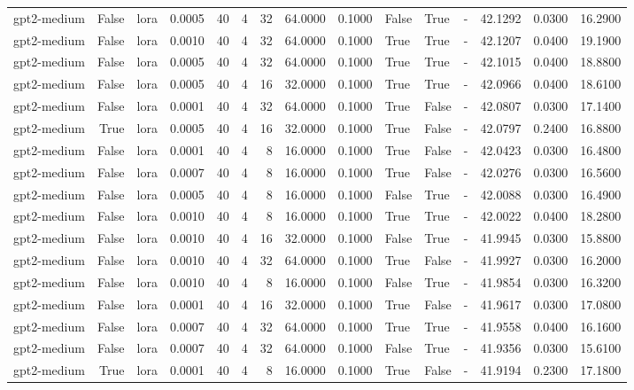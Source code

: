 \begin{tabular}{lrlrrrrrrlllrrr}
gpt2-medium & False & lora & 0.0005 & 40 & 4 & 32 & 64.0000 & 0.1000 & False & True & - & 42.1292 & 0.0300 & 16.2900 \\
gpt2-medium & False & lora & 0.0010 & 40 & 4 & 32 & 64.0000 & 0.1000 & True & True & - & 42.1207 & 0.0400 & 19.1900 \\
gpt2-medium & False & lora & 0.0005 & 40 & 4 & 32 & 64.0000 & 0.1000 & True & True & - & 42.1015 & 0.0400 & 18.8800 \\
gpt2-medium & False & lora & 0.0005 & 40 & 4 & 16 & 32.0000 & 0.1000 & True & True & - & 42.0966 & 0.0400 & 18.6100 \\
gpt2-medium & False & lora & 0.0001 & 40 & 4 & 32 & 64.0000 & 0.1000 & True & False & - & 42.0807 & 0.0300 & 17.1400 \\
gpt2-medium & True & lora & 0.0005 & 40 & 4 & 16 & 32.0000 & 0.1000 & True & False & - & 42.0797 & 0.2400 & 16.8800 \\
gpt2-medium & False & lora & 0.0001 & 40 & 4 & 8 & 16.0000 & 0.1000 & True & False & - & 42.0423 & 0.0300 & 16.4800 \\
gpt2-medium & False & lora & 0.0007 & 40 & 4 & 8 & 16.0000 & 0.1000 & True & False & - & 42.0276 & 0.0300 & 16.5600 \\
gpt2-medium & False & lora & 0.0005 & 40 & 4 & 8 & 16.0000 & 0.1000 & False & True & - & 42.0088 & 0.0300 & 16.4900 \\
gpt2-medium & False & lora & 0.0010 & 40 & 4 & 8 & 16.0000 & 0.1000 & True & True & - & 42.0022 & 0.0400 & 18.2800 \\
gpt2-medium & False & lora & 0.0010 & 40 & 4 & 16 & 32.0000 & 0.1000 & False & True & - & 41.9945 & 0.0300 & 15.8800 \\
gpt2-medium & False & lora & 0.0010 & 40 & 4 & 32 & 64.0000 & 0.1000 & True & False & - & 41.9927 & 0.0300 & 16.2000 \\
gpt2-medium & False & lora & 0.0010 & 40 & 4 & 8 & 16.0000 & 0.1000 & False & True & - & 41.9854 & 0.0300 & 16.3200 \\
gpt2-medium & False & lora & 0.0001 & 40 & 4 & 16 & 32.0000 & 0.1000 & True & False & - & 41.9617 & 0.0300 & 17.0800 \\
gpt2-medium & False & lora & 0.0007 & 40 & 4 & 32 & 64.0000 & 0.1000 & True & True & - & 41.9558 & 0.0400 & 16.1600 \\
gpt2-medium & False & lora & 0.0007 & 40 & 4 & 32 & 64.0000 & 0.1000 & False & True & - & 41.9356 & 0.0300 & 15.6100 \\
gpt2-medium & True & lora & 0.0001 & 40 & 4 & 8 & 16.0000 & 0.1000 & True & False & - & 41.9194 & 0.2300 & 17.1800 \\

\end{tabular}
